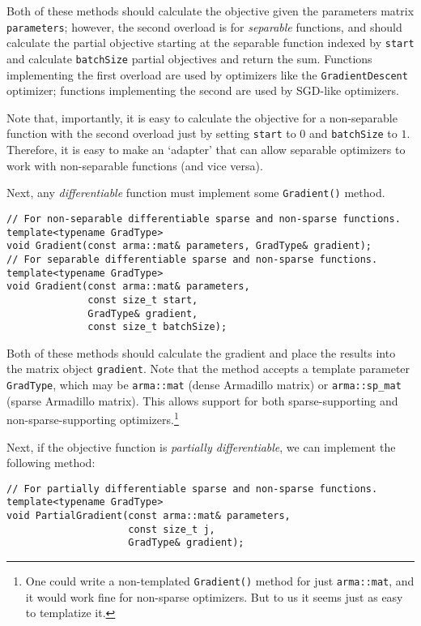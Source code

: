 \documentclass{article}
\begin{document}
Both of these methods should calculate the objective given the parameters
matrix {\tt parameters}; however, the second overload is for {\it separable}
functions, and should calculate the partial objective starting at the separable
function indexed by {\tt start} and calculate {\tt batchSize} partial objectives
and return the sum.  Functions implementing the first overload are used by
optimizers like the {\tt GradientDescent} optimizer; functions implementing the
second are used by SGD-like optimizers.

Note that, importantly, it is easy to calculate the objective for a
non-separable function with the second overload just by setting {\tt start} to
$0$ and {\tt batchSize} to $1$.  Therefore, it is easy to make an `adapter' that
can allow separable optimizers to work with non-separable functions (and vice
versa).

Next, any {\it differentiable} function must implement some {\tt Gradient()}
method.

\vspace*{-0.3em}
\begin{verbatim}
// For non-separable differentiable sparse and non-sparse functions.
template<typename GradType>
void Gradient(const arma::mat& parameters, GradType& gradient);
// For separable differentiable sparse and non-sparse functions.
template<typename GradType>
void Gradient(const arma::mat& parameters,
              const size_t start,
              GradType& gradient,
              const size_t batchSize);
\end{verbatim}
\vspace*{-0.3em}

Both of these methods should calculate the gradient and place the results into
the matrix object {\tt gradient}.  Note that the method accepts a template
parameter {\tt GradType}, which may be {\tt arma::mat} (dense Armadillo matrix)
or {\tt arma::sp\_mat} (sparse Armadillo matrix).  This allows support for both
sparse-supporting and non-sparse-supporting optimizers.\footnote{One could write
a non-templated {\tt Gradient()} method for just {\tt arma::mat}, and it would
work fine for non-sparse optimizers.  But to us it seems just as easy to
templatize it.}

Next, if the objective function is {\it partially differentiable}, we can
implement the following method:

\vspace*{-0.3em}
\begin{verbatim}
// For partially differentiable sparse and non-sparse functions.
template<typename GradType>
void PartialGradient(const arma::mat& parameters,
                     const size_t j,
                     GradType& gradient);
\end{verbatim}
\vspace*{-0.3em}
\end{document}
